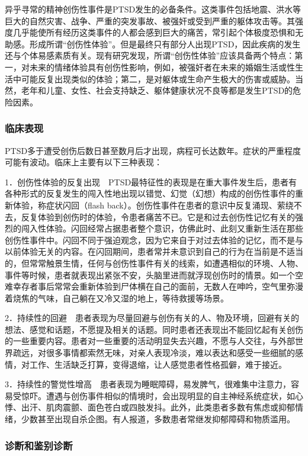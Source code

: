异乎寻常的精神创伤性事件是PTSD发生的必备条件。这类事件包括地震、洪水等巨大的自然灾害、战争、严重的突发事故、被强奸或受到严重的躯体攻击等。其强度几乎能使所有经历这类事件的人都会感到巨大的痛苦，常引起个体极度恐惧和无助感。形成所谓“创伤性体验”。但是最终只有部分人出现PTSD，因此疾病的发生还与个体易感素质有关。现有研究发现，所谓“创伤性体验”应该具备两个特点：第一，对未来的情绪体验具有创伤性影响，例如，被强奸者在未来的婚姻生活或性生活中可能反复出现类似的体验；第二，是对躯体或生命产生极大的伤害或威胁。当然，老年和儿童、女性、社会支持缺乏、躯体健康状况不良等都是发生PTSD的危险因素。

\subsubsection{临床表现}

PTSD多于遭受创伤后数日甚至数月后才出现，病程可长达数年。症状的严重程度可能有波动。临床上主要有以下三种表现：

1．创伤性体验的反复出现　PTSD最特征性的表现是在重大事件发生后，患者有各种形式的反复发生的闯入性地出现以错觉、幻觉（幻想）构成的创伤性事件的重新体验，称症状闪回（flash
back）。创伤性事件在患者的意识中反复涌现、萦绕不去，反复体验到创伤时的体验，令患者痛苦不已。它是和过去创伤性记忆有关的强烈的闯入性体验。闪回经常占据患者整个意识，仿佛此时、此刻又重新生活在那些创伤性事件中。闪回不同于强迫观念，因为它来自于对过去体验的记忆，而不是与以前体验无关的内容。在闪回期间，患者常并未意识到自己的行为在当前是不适当的，但常常触景生情，任何与创伤性事件有关的线索，如遭遇相似的环境、人物、事件等时候，患者就表现出紧张不安，头脑里进而就浮现创伤时的情景。如一个空难幸存者事后常常会重新体验到尸体横在自己的面前，无数人在呻吟，空气里弥漫着烧焦的气味，自己躺在又冷又湿的地上，等待救援等场景。

2．持续性的回避　患者表现为尽量回避与创伤有关的人、物及环境，回避有关的想法、感觉和话题，不愿提及相关的话题。同时患者还表现出不能回忆起有关创伤的一些重要内容。患者对一些重要的活动明显失去兴趣，不愿与人交往，与外部世界疏远，对很多事情都索然无味，对亲人表现冷淡，难以表达和感受一些细腻的感情，对工作、生活缺乏打算，变得退缩，让人感觉患者性格孤僻，难于接近。

3．持续性的警觉性增高　患者表现为睡眠障碍，易发脾气，很难集中注意力，容易受惊吓。遭遇与创伤事件相似的情境时，会出现明显的自主神经系统症状，如心悸、出汗、肌肉震颤、面色苍白或四肢发抖。此外，此类患者多数有焦虑或抑郁情绪，少数甚至出现自杀企图。有人报道，多数患者常继发抑郁障碍和物质滥用。

\subsubsection{诊断和鉴别诊断}

